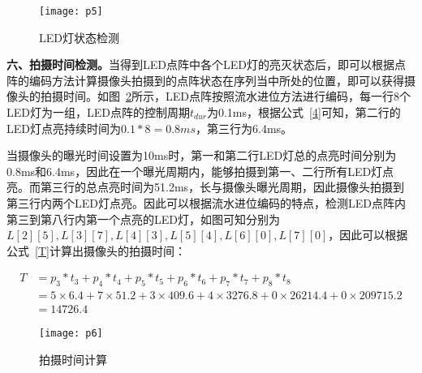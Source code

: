 \begin{figure}[h] 
  \centering
  \texttt{[image: p5]}
  \caption{LED灯状态检测}
  \label{p5}
\end{figure}

\textbf{六、拍摄时间检测。}当得到LED点阵中各个LED灯的亮灭状态后，即可以根据点阵的编码方法计算摄像头拍摄到的点阵状态在序列当中所处的位置，即可以获得摄像头的拍摄时间。如图~\ref{p6}所示，LED点阵按照流水进位方法进行编码，每一行8个LED灯为一组，LED点阵的控制周期$t_{dur}$为0.1ms，根据公式~\ref{4}可知，第二行的LED灯点亮持续时间为$0.1 * 8 = 0.8ms$，第三行为6.4ms。

当摄像头的曝光时间设置为10ms时，第一和第二行LED灯总的点亮时间分别为0.8ms和6.4ms，因此在一个曝光周期内，能够拍摄到第一、二行所有LED灯点亮。而第三行的总点亮时间为51.2ms，长与摄像头曝光周期，因此摄像头拍摄到第三行内两个LED灯点亮。因此可以根据流水进位编码的特点，检测LED点阵内第三到第八行内第一个点亮的LED灯，如图可知分别为$L[2][5], L[3][7], L[4][3], L[5][4], L[6][0], L[7][0]$，因此可以根据公式~\ref{T}计算出摄像头的拍摄时间：

\begin{equation}
\begin{split}
T &= p_3 * t_3 +p_4 * t_4 +p_5 * t_5 +p_6 * t_6 +p_7 * t_7 +p_8 * t_8\\
&=5 \times 6.4 + 7 \times 51.2  +3\times 409.6 + 4\times3276.8  +0\times26214.4  +0\times209715.2\\
&=14726.4 
\end{split}
\end{equation}


\begin{figure}[h] 
  \centering
  \texttt{[image: p6]}
  \caption{拍摄时间计算}
  \label{p6}
\end{figure}

